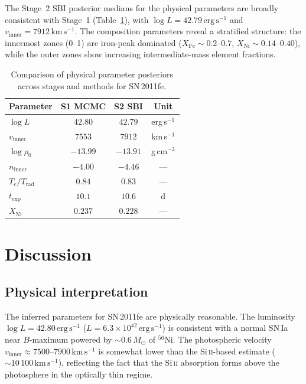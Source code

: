 \documentclass[fleqn,usenatbib]{mnras}
\newcommand{\kms}{\ensuremath{\,\mathrm{km\,s^{-1}}}}
\newcommand{\ergs}{\ensuremath{\,\mathrm{erg\,s^{-1}}}}
\newcommand{\SiII}{Si\,\textsc{ii}}
\begin{document}
The Stage~2 SBI posterior medians for the physical parameters are broadly consistent with Stage~1 (Table~\ref{tab:posterior_s2}), with $\log L = 42.79\ergs$ and $v_\mathrm{inner} = 7912\kms$. The composition parameters reveal a stratified structure: the innermost zones (0--1) are iron-peak dominated ($X_\mathrm{Fe} \sim 0.2$--$0.7$, $X_\mathrm{Ni} \sim 0.14$--$0.40$), while the outer zones show increasing intermediate-mass element fractions.

\begin{table}
\centering
\caption{Comparison of physical parameter posteriors across stages and methods for SN\,2011fe.}
\label{tab:posterior_s2}
\begin{tabular}{lccc}
\toprule
Parameter & S1 MCMC & S2 SBI & Unit \\
\midrule
$\log L$ & $42.80$ & $42.79$ & erg\,s$^{-1}$ \\
$v_\mathrm{inner}$ & $7553$ & $7912$ & km\,s$^{-1}$ \\
$\log \rho_0$ & $-13.99$ & $-13.91$ & g\,cm$^{-3}$ \\
$n_\mathrm{inner}$ & $-4.00$ & $-4.46$ & --- \\
$T_e / T_\mathrm{rad}$ & $0.84$ & $0.83$ & --- \\
$t_\mathrm{exp}$ & $10.1$ & $10.6$ & d \\
$X_\mathrm{Ni}$ & $0.237$ & $0.228$ & --- \\
\bottomrule
\end{tabular}
\end{table}


\section{Discussion}
\label{sec:discussion}

\subsection{Physical interpretation}
\label{sec:interpretation}

The inferred parameters for SN\,2011fe are physically reasonable. The luminosity $\log L = 42.80\ergs$ ($L = 6.3 \times 10^{42}\ergs$) is consistent with a normal SN\,Ia near $B$-maximum powered by ${\sim}0.6\,M_\odot$ of $^{56}$Ni. The photospheric velocity $v_\mathrm{inner} \approx 7500$--$7900\kms$ is somewhat lower than the \SiII{}-based estimate (${\sim}10\,100\kms$), reflecting the fact that the \SiII{} absorption forms above the photosphere in the optically thin regime.
\end{document}
